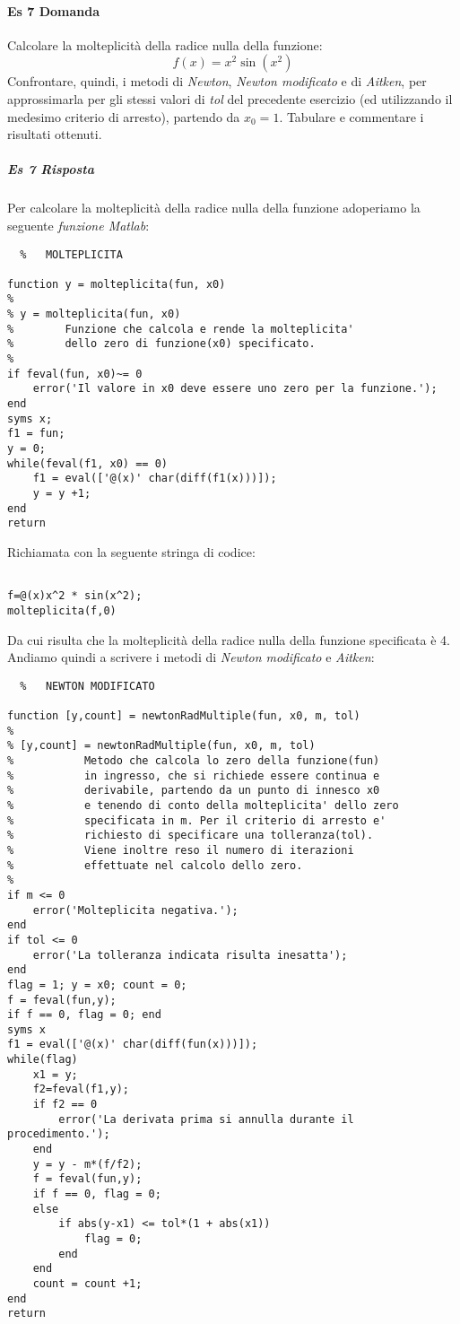 \documentclass[a4paper]{report}
\begin{document}
\paragraph{Es 7 Domanda}
Calcolare la molteplicità della radice nulla della funzione:
\[
f(x) = x^2 \sin(x^2)
\]
Confrontare, quindi, i metodi di \emph{Newton}, \emph{Newton modificato} e di \emph{Aitken}, per approssimarla per gli stessi valori di \emph{tol} del precedente esercizio (ed utilizzando il medesimo criterio di arresto), partendo da $x_0 = 1$. Tabulare e commentare i risultati ottenuti.
\subparagraph{Es 7 Risposta}
Per calcolare la molteplicità della radice nulla della funzione adoperiamo la seguente \emph{funzione Matlab}:\\
\begin{lstlisting}	%	MOLTEPLICITA

function y = molteplicita(fun, x0)
%
% y = molteplicita(fun, x0)
%        Funzione che calcola e rende la molteplicita'
%        dello zero di funzione(x0) specificato.
%
if feval(fun, x0)~= 0
	error('Il valore in x0 deve essere uno zero per la funzione.');
end
syms x;
f1 = fun;
y = 0;
while(feval(f1, x0) == 0)
	f1 = eval(['@(x)' char(diff(f1(x)))]);
	y = y +1;
end
return
\end{lstlisting}
Richiamata con la seguente stringa di codice:\\
\begin{lstlisting}

f=@(x)x^2 * sin(x^2);
molteplicita(f,0)
\end{lstlisting}
Da cui risulta che la molteplicità della radice nulla della funzione specificata è 4.
Andiamo quindi a scrivere i metodi di \emph{Newton modificato} e \emph{Aitken}:
\newpage
\begin{lstlisting}	%	NEWTON MODIFICATO

function [y,count] = newtonRadMultiple(fun, x0, m, tol)
%
% [y,count] = newtonRadMultiple(fun, x0, m, tol)
%           Metodo che calcola lo zero della funzione(fun)
%           in ingresso, che si richiede essere continua e 
%           derivabile, partendo da un punto di innesco x0
%           e tenendo di conto della molteplicita' dello zero
%           specificata in m. Per il criterio di arresto e'
%           richiesto di specificare una tolleranza(tol).
%           Viene inoltre reso il numero di iterazioni
%           effettuate nel calcolo dello zero.
%
if m <= 0
	error('Molteplicita negativa.');
end
if tol <= 0
	error('La tolleranza indicata risulta inesatta');
end
flag = 1; y = x0; count = 0;
f = feval(fun,y);
if f == 0, flag = 0; end
syms x
f1 = eval(['@(x)' char(diff(fun(x)))]);
while(flag)
	x1 = y;
	f2=feval(f1,y);
	if f2 == 0
		error('La derivata prima si annulla durante il procedimento.');
	end
	y = y - m*(f/f2);
	f = feval(fun,y);
	if f == 0, flag = 0;
	else
		if abs(y-x1) <= tol*(1 + abs(x1))
			flag = 0;
		end
	end
	count = count +1;
end
return
\end{lstlisting}
\end{document}
